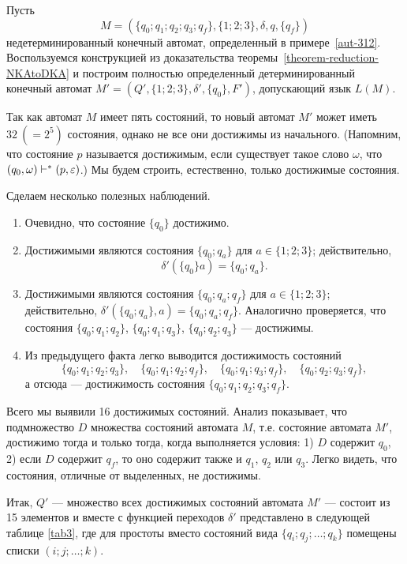 \begin{myexample}
\label{example-NKAtoDKA-321}
Пусть
\[
M=(\{q_0;q_1;q_2;q_3;q_f\},\{1;2;3\},\delta,q,\{q_f\})
\]
недетерминированный конечный автомат, определенный в примере~\ref{aut-312}. Воспользуемся конструкцией из доказательства теоремы~\ref{theorem-reduction-NKAtoDKA} и построим полностью определенный детерминированный конечный автомат $M'=(Q',\{1;2;3\},\delta',\{q_0\},F')$, допускающий язык $L(M)$.

Так как автомат $M$ имеет пять состояний, то новый автомат $M'$ может иметь $32~(=2^5)$ состояния, однако не все они достижимы из начального. (Напомним, что состояние $p$ называется достижимым, если существует такое слово $\omega$, что $(q_0,\omega)\vdash^*(p,\varepsilon)$.) Мы будем строить, естественно, только достижимые состояния.

Сделаем несколько полезных наблюдений.
\begin{enumerate}
    \item Очевидно, что состояние $\{q_0\}$ достижимо.

    \item Достижимыми являются состояния $\{q_0;q_a\}$ для
    $a\in \{1;2;3\}$; действительно,
    \[
        \delta'(\{q_0\}a)=\{q_0;q_a\}.
    \]

    \item Достижимыми являются состояния $\{q_0;q_a;q_f\}$ для $a\in\{1;2;3\}$; действительно, $\delta'(\{q_0;q_a\},a)=\{q_0;q_a;q_f\}$. Аналогично проверяется, что состояния $\{q_0;q_1;q_2\}$, $\{q_0;q_1;q_3\}$, $\{q_0;q_2;q_3\}$ --- достижимы.

    \item Из предыдущего факта легко выводится достижимость состояний
    \[
        \{q_0;q_1;q_2;q_3\}, \quad \{q_0;q_1;q_2;q_f\}, \quad
        \{q_0;q_1;q_3;q_f\}, \quad \{q_0;q_2;q_3;q_f\},
    \]
    а отсюда --- достижимость состояния $\{q_0;q_1;q_2;q_3;q_f\}$.
\end{enumerate}

Всего мы выявили 16 достижимых состояний. Анализ показывает, что подмножество $D$ множества состояний автомата $M$, т.е. состояние автомата $M'$, достижимо тогда и только тогда, когда выполняется условия: 1) $D$ содержит $q_0$, 2) если $D$ содержит $q_f$, то оно содержит также и $q_1$, $q_2$ или $q_3$. Легко видеть, что состояния, отличные от выделенных, не достижимы.

Итак, $Q'$ --- множество всех достижимых состояний автомата $M'$ --- состоит из 15 элементов и вместе с функцией переходов $\delta'$ представлено в следующей таблице \ref{tab3}, где для простоты вместо состояний вида $\{q_i;q_j;\ldots ;q_k\}$ помещены списки $(i;j;\ldots ;k)$.


\end{myexample}
